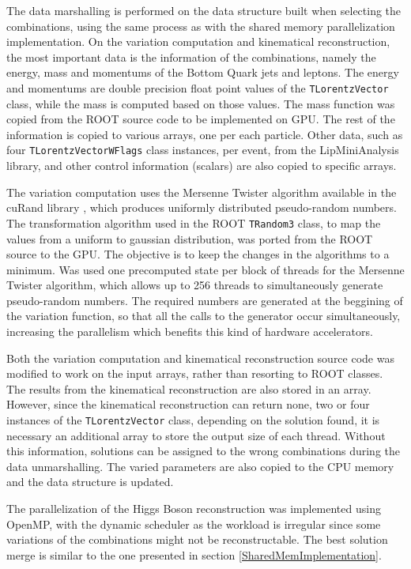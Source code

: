 The data marshalling is performed on the data structure built when selecting the combinations, using the same process as with the shared memory parallelization implementation. On the variation computation and kinematical reconstruction, the most important data is the information of the combinations, namely the energy, mass and momentums of the Bottom Quark jets and leptons. The energy and momentums are double precision float point values of the \texttt{TLorentzVector} class, while the mass is computed based on those values. The mass function was copied from the ROOT source code to be implemented on GPU. The rest of the information is copied to various arrays, one per each particle. Other data, such as four \texttt{TLorentzVectorWFlags} class instances, per event, from the LipMiniAnalysis library, and other control information (scalars) are also copied to specific arrays.

The variation computation uses the Mersenne Twister algorithm available in the \nvidia cuRand library \cite{NVIDIA:cuRand}, which produces uniformly distributed pseudo-random numbers. The transformation algorithm used in the ROOT \texttt{TRandom3} class, to map the values from a uniform to gaussian distribution, was ported from the ROOT source to the GPU. The objective is to keep the changes in the \ttDilepKinFit algorithms to a minimum. Was used one precomputed state per block of threads for the Mersenne Twister algorithm, which allows up to 256 threads to simultaneously generate pseudo-random numbers. The required numbers are generated at the beggining of the variation function, so that all the calls to the generator occur simultaneously, increasing the parallelism which benefits this kind of hardware 
accelerators.

Both the variation computation and kinematical reconstruction source code was modified to work on the input arrays, rather than resorting to ROOT classes. The results from the kinematical reconstruction are also stored in an array. However, since the kinematical reconstruction can return none, two or four instances of the \texttt{TLorentzVector} class, depending on the solution found, it is necessary an additional array to store the output size of each thread. Without this information, solutions can be assigned to the wrong combinations during the data unmarshalling. The varied parameters are also copied to the CPU memory and the data structure is updated.

The parallelization of the Higgs Boson reconstruction was implemented using OpenMP, with the dynamic scheduler as the workload is irregular since some variations of the combinations might not be reconstructable. The best solution merge is similar to the one presented in section \ref{SharedMemImplementation}.

